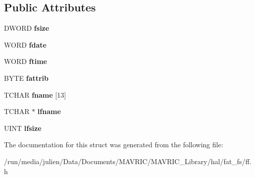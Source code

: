 \subsection*{Public Attributes}
\begin{DoxyCompactItemize}
\item 
\hypertarget{structFILINFO_aee7441af7dc0c443d1e1e6011cc7dcac}{D\+W\+O\+R\+D {\bfseries fsize}}\label{structFILINFO_aee7441af7dc0c443d1e1e6011cc7dcac}

\item 
\hypertarget{structFILINFO_a7c01c48a15b1b49da459924437b0bd52}{W\+O\+R\+D {\bfseries fdate}}\label{structFILINFO_a7c01c48a15b1b49da459924437b0bd52}

\item 
\hypertarget{structFILINFO_ae0f751b79621bf7b29669f177bbe6b9a}{W\+O\+R\+D {\bfseries ftime}}\label{structFILINFO_ae0f751b79621bf7b29669f177bbe6b9a}

\item 
\hypertarget{structFILINFO_a838d542585831b085537b363f18205c0}{B\+Y\+T\+E {\bfseries fattrib}}\label{structFILINFO_a838d542585831b085537b363f18205c0}

\item 
\hypertarget{structFILINFO_abd852510f2f79b4ec773156d8942dc7c}{T\+C\+H\+A\+R {\bfseries fname} \mbox{[}13\mbox{]}}\label{structFILINFO_abd852510f2f79b4ec773156d8942dc7c}

\item 
\hypertarget{structFILINFO_ac4506c29e0219130dff46b01a1b5c023}{T\+C\+H\+A\+R $\ast$ {\bfseries lfname}}\label{structFILINFO_ac4506c29e0219130dff46b01a1b5c023}

\item 
\hypertarget{structFILINFO_a2527c511ff4d12d285dbf3c4b3c9fb7b}{U\+I\+N\+T {\bfseries lfsize}}\label{structFILINFO_a2527c511ff4d12d285dbf3c4b3c9fb7b}

\end{DoxyCompactItemize}


The documentation for this struct was generated from the following file\+:\begin{DoxyCompactItemize}
\item 
/run/media/julien/\+Data/\+Documents/\+M\+A\+V\+R\+I\+C/\+M\+A\+V\+R\+I\+C\+\_\+\+Library/hal/fat\+\_\+fs/ff.\+h\end{DoxyCompactItemize}
